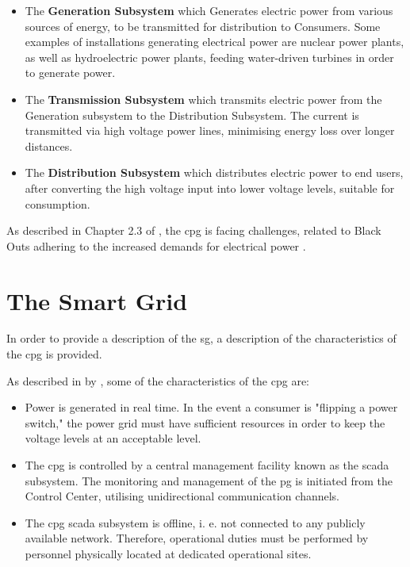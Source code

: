 \begin{itemize}

 \item The \textbf{Generation Subsystem} which Generates electric power from various sources of energy, to be transmitted for distribution to Consumers. Some examples of installations generating electrical power are nuclear power plants, as well as hydroelectric power plants, feeding water-driven turbines in order to generate power.
 \item The \textbf{Transmission Subsystem} which transmits electric power from the Generation subsystem to the Distribution Subsystem. The current is transmitted via high voltage power lines, minimising energy loss over longer distances.
 \item The \textbf{Distribution Subsystem} which distributes electric power to end users, after converting the high voltage input into lower voltage levels, suitable for consumption.
 \end{itemize}

As described in Chapter 2.3 of \cite{Rihan2018} %
, the \acrlong{cpg} is facing challenges, related to Black Outs adhering to the increased demands for electrical power . 


\section{The Smart Grid}




In order to provide a description of the \acrfull{sg}, a description of the characteristics of the \acrlong{cpg} is provided.





As described in  \cite{BlumeStevenW2007Epsb} by \citeauthor{BlumeStevenW2007Epsb}, some of the characteristics of the \acrlong{cpg} are:

\begin{itemize}
\item Power is generated in real time. In the event a consumer is "flipping a power switch," the power grid must have sufficient resources in order to keep the voltage levels at an acceptable level.
\item The \acrlong{cpg} is controlled by a central management facility known as the \acrfull{scada} subsystem. The monitoring and management of the \acrshort{pg} is initiated from the Control Center, utilising unidirectional communication channels. 
\item The \acrlong{cpg} \acrlong{scada} subsystem is offline, i. e. not connected to any publicly available network. Therefore, operational duties must be performed by personnel physically located at dedicated operational sites.

\end{itemize}

